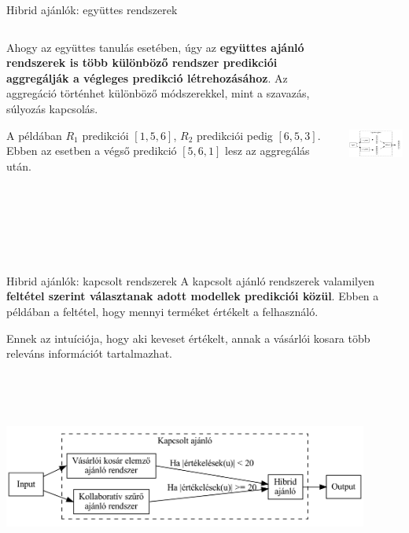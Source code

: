 \documentclass[english, aspectratio=169]{beamer}
\begin{document}
\begin{frame}{Hibrid ajánlók: együttes rendszerek}
\begin{columns}
\begin{column}{.5\textwidth}
Ahogy az együttes tanulás esetében, úgy az \textbf{együttes ajánló rendszerek is több különböző rendszer predikciói aggregálják a végleges predikció létrehozásához}. Az aggregáció történhet különböző módszerekkel, mint a szavazás, súlyozás kapcsolás.\par\smallskip
A példában $R_1$ predikciói $\left[ 1,5,6 \right]$, $R_2$ predikciói pedig $\left[  6,5,3\right]$. Ebben az esetben a végső predikció $\left[ 5,6,1 \right]$ lesz az aggregálás után.
\end{column}
\begin{column}{.5\textwidth}
\begin{center}
\includegraphics[width=7cm, height=7cm, keepaspectratio]{graphs/recommender_13.png}
\end{center}
\end{column}
\end{columns}
\end{frame}

\begin{frame}{Hibrid ajánlók: kapcsolt rendszerek}
A kapcsolt ajánló rendszerek valamilyen \textbf{feltétel szerint választanak adott modellek predikciói közül}. Ebben a példában a feltétel, hogy mennyi terméket értékelt a felhasználó.\par\smallskip
Ennek az intuíciója, hogy aki keveset értékelt, annak a vásárlói kosara több releváns információt tartalmazhat.
\begin{center}
\includegraphics[width=12cm, height=7cm, keepaspectratio]{graphs/recommender_14.png}
\end{center}
\end{frame}
\end{document}
